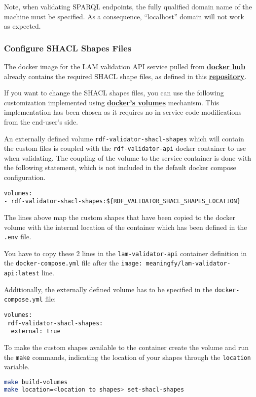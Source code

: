 Note, when validating SPARQL endpoints, the fully qualified domain name of the machine must be specified. As a consequence, ``localhost'' domain will not work as expected.

\subsubsection{Configure SHACL Shapes Files}
\label{sec:rdf-validator-ss}
The docker image for the LAM validation API service pulled from \textbf{\href{https://registry.hub.docker.com/r/meaningfy/lam-validator-api}{docker hub}} already contains the required SHACL shape files, as defined in this \textbf{\href{https://github.com/meaningfy-ws/lam-validator/tree/main/resources}{repository}}.

If you want to change the SHACL shapes files, you can use the following customization implemented using \textbf{\href{https://docs.docker.com/storage/volumes/}{docker's volumes}} mechanism. This implementation has been chosen as it requires no in service code modifications from the end-user's side.

An externally defined volume \texttt{rdf-validator-shacl-shapes} which will contain the custom files is coupled with the \texttt{rdf-validator-api} docker container to use when validating. The coupling of the volume to the service container is done with the following statement, which is not included in the default docker compose configuration.

\begin{lstlisting}[]
volumes:
- rdf-validator-shacl-shapes:${RDF_VALIDATOR_SHACL_SHAPES_LOCATION}
\end{lstlisting}

The lines above map the custom shapes that have been copied to the docker volume with the internal location of the container which has been defined in the \texttt{.env} file.

You have to copy these 2 lines in the \texttt{lam-validator-api} container definition in the \texttt{docker-compose.yml} file after the \texttt{image: meaningfy/lam-validator-api:latest} line.

Additionally, the externally defined volume has to be specified in the \texttt{docker-compose.yml} file:
\begin{lstlisting}[]
volumes:
 rdf-validator-shacl-shapes:
  external: true
\end{lstlisting}

To make the custom shapes available to the container create the volume and run the \texttt{make} commands, indicating the location of your shapes through the \texttt{location} variable.
\begin{lstlisting}[language=bash]
make build-volumes
make location=<location to shapes> set-shacl-shapes
\end{lstlisting}

